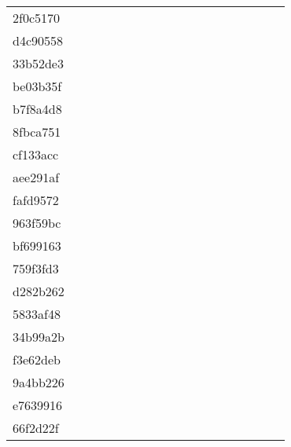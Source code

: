 \begin{table*}[htb]
\begin{tabular}{l|ccccccccccccccccc}
2f0c5170  & \C & \X & \X & \X & \X & \X & \X & \X & \X & \X & \X & \X & \X & \C & \C & \X & \X\\
d4c90558  & \C & \X & \X & \X & \X & \X & \X & \X & \X & \X & \X & \X & \X & \C & \C & \X & \X\\
33b52de3  & \C & \X & \X & \X & \X & \X & \X & \X & \C & \X & \X & \X & \X & \C & \C & \C & \C\\
be03b35f  & \C & \X & \C & \X & \X & \X & \C & \X & \C & \X & \C & \C & \C & \C & \C & \C & \C\\
b7f8a4d8  & \C & \X & \X & \X & \X & \X & \X & \X & \X & \X & \X & \X & \X & \C & \C & \C & \C\\
8fbca751  & \C & \X & \X & \X & \C & \X & \X & \X & \X & \X & \X & \X & \X & \X & \C & \X & \C\\
cf133acc  & \C & \X & \X & \X & \X & \X & \X & \X & \X & \X & \X & \X & \X & \C & \C & \C & \C\\
aee291af  & \C & \X & \X & \X & \X & \X & \X & \X & \X & \X & \X & \X & \X & \C & \C & \X & \C\\
fafd9572  & \C & \X & \X & \X & \X & \X & \X & \X & \X & \X & \X & \X & \X & \C & \C & \C & \C\\
963f59bc  & \C & \X & \X & \X & \X & \X & \X & \X & \X & \X & \X & \X & \X & \C & \C & \X & \X\\
bf699163  & \C & \X & \X & \C & \X & \X & \C & \X & \X & \X & \X & \X & \X & \C & \C & \X & \C\\
759f3fd3  & \C & \X & \X & \X & \X & \X & \X & \X & \X & \X & \X & \X & \X & \C & \C & \X & \X\\
d282b262  & \C & \X & \X & \X & \X & \X & \X & \X & \X & \X & \X & \X & \X & \C & \C & \X & \X\\
5833af48  & \C & \X & \X & \X & \X & \X & \X & \X & \X & \X & \X & \X & \X & \C & \C & \X & \X\\
34b99a2b  & \C & \X & \X & \X & \X & \X & \X & \X & \X & \X & \X & \X & \X & \C & \C & \C & \C\\
f3e62deb  & \C & \X & \C & \X & \X & \X & \X & \X & \C & \X & \C & \X & \C & \C & \C & \X & \C\\
9a4bb226  & \C & \X & \X & \X & \X & \X & \X & \X & \C & \X & \C & \X & \C & \C & \C & \X & \X\\
e7639916  & \C & \X & \X & \X & \X & \X & \X & \C & \C & \X & \X & \C & \C & \C & \C & \C & \C\\
66f2d22f  & \C & \X & \X & \X & \X & \X & \X & \X & \X & \X & \X & \X & \X & \C & \C & \C & \C\\

\end{tabular}
\end{table*}
